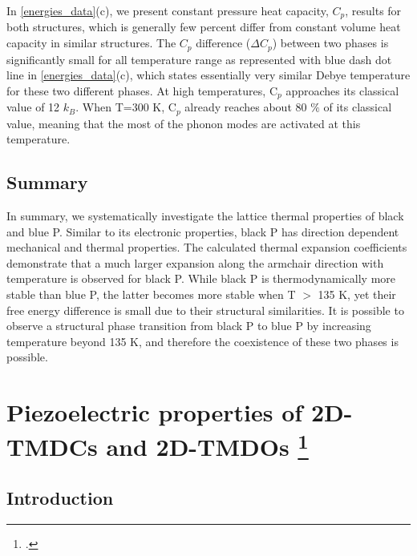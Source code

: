 In \autoref{energies_data}(c), we present constant pressure heat capacity, $C_p$, results for both structures, which is generally few percent differ from constant volume heat capacity in similar structures\cite{QHA1}. The $C_p$ difference ($\Delta C_p$) between two phases is significantly small for all temperature range as represented with blue dash dot line in \autoref{energies_data}(c), which states essentially very similar Debye temperature for these two different phases.  At high temperatures, C$_p$ approaches its classical value of 12 $k_B$.  When T=300 K, C$_p$ already reaches about 80 $\%$ of its classical value, meaning that the most of the phonon modes are activated at this temperature. 

\subsection{Summary}

In summary, we systematically investigate the lattice thermal properties of black and blue P. Similar to its electronic properties, black P has direction dependent mechanical and thermal properties. The calculated thermal expansion coefficients demonstrate that a much larger expansion along the armchair direction with temperature is observed for black P. While black P is thermodynamically more stable than blue P, the latter becomes more stable when T $>$ 135 K, yet their free energy difference is small due to their structural similarities. It is possible to observe a structural phase transition from black P to blue P by increasing temperature beyond 135 K, and therefore the coexistence of these two phases is possible. 

\section[Piezoelectric properties of 2D-TMDCs and 2D-TMDOs]{Piezoelectric properties of 2D-TMDCs and 2D-TMDOs \footcite[This work is published in:][]{Menderes2015}}

\subsection{Introduction}

